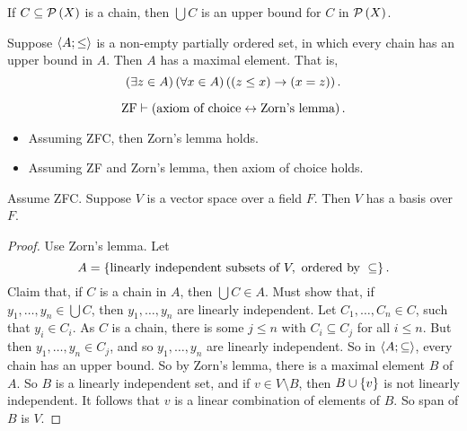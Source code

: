 \begin{example2}
If $ C \subseteq \mathcal{P}\left( X \right) $ is a chain, then $ \bigcup C $ is an upper bound for $ C $ in $ \mathcal{P}\left( X \right) $.
\end{example2}

\begin{definition}
Suppose $ \left\langle A; \le \right\rangle $ is a non-empty partially ordered set, in which every chain has an upper bound in $ A $. Then $ A $ has a maximal element. That is,
$$ \left( \exists z \in A \right)\left( \forall x \in A \right)\left( \left( z \le x \right) \rightarrow \left( x = z \right) \right). $$
\end{definition}

\begin{theorem}
\label{thm:4.3.2}
$$ \text{ZF} \vdash \left( \text{axiom of choice} \leftrightarrow \text{Zorn's lemma} \right). $$
\begin{itemize}
\item Assuming ZFC, then Zorn's lemma holds.
\item Assuming ZF and Zorn's lemma, then axiom of choice holds.
\end{itemize}
\end{theorem}

\begin{example1}
Assume ZFC. Suppose $ V $ is a vector space over a field $ F $. Then $ V $ has a basis over $ F $.
\end{example1}

\begin{proof}
Use Zorn's lemma. Let
$$ A = \cb{\text{linearly independent subsets of} \ V, \ \text{ordered by} \ \subseteq}. $$
Claim that, if $ C $ is a chain in $ A $, then $ \bigcup C \in A $. Must show that, if $ y_1, \dots, y_n \in \bigcup C $, then $ y_1, \dots, y_n $ are linearly independent. Let $ C_1, \dots, C_n \in C $, such that $ y_i \in C_i $. As $ C $ is a chain, there is some $ j \le n $ with $ C_i \subseteq C_j $ for all $ i \le n $. But then $ y_1, \dots, y_n \in C_j $, and so $ y_1, \dots, y_n $ are linearly independent. So in $ \left\langle A; \subseteq \right\rangle $, every chain has an upper bound. So by Zorn's lemma, there is a maximal element $ B $ of $ A $. So $ B $ is a linearly independent set, and if $ v \in V \setminus B $, then $ B \cup \left\{ v \right\} $ is not linearly independent. It follows that $ v $ is a linear combination of elements of $ B $. So span of $ B $ is $ V $.
\end{proof}

